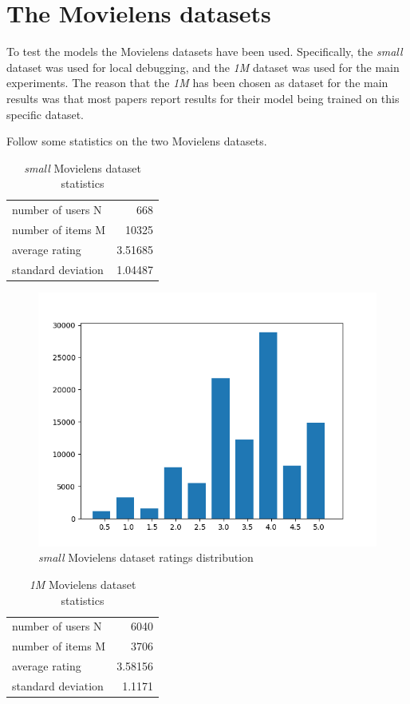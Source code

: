 \section{The Movielens datasets}

To test the models the Movielens datasets\cite{movielens} have been used. 
Specifically, the \emph{small} dataset was used for local debugging, and the \emph{1M}
dataset was used for the main experiments. The reason that the \emph{1M} has been
chosen as dataset for the main results was that most papers report results for their
model being trained on this specific dataset.

Follow some statistics on the two Movielens datasets.

\begin{table}[H]
\centering
\begin{tabular}{l|r}
number of users N & 668 \\
number of items M & 10325 \\
average rating & 3.51685 \\
standard deviation & 1.04487 \\
\end{tabular}
\caption{\emph{small} Movielens dataset statistics}
\end{table}

\begin{figure}[H]
\centering
\includegraphics[scale=0.6]{small}
\caption{\emph{small} Movielens dataset ratings distribution}
\end{figure}

\begin{table}[H]
\centering
\begin{tabular}{l|r}
number of users N&  6040 \\ 
number of items M& 3706 \\
average rating & 3.58156 \\
standard deviation & 1.1171 \\
\end{tabular}
\caption{\emph{1M} Movielens dataset statistics}
\end{table}

